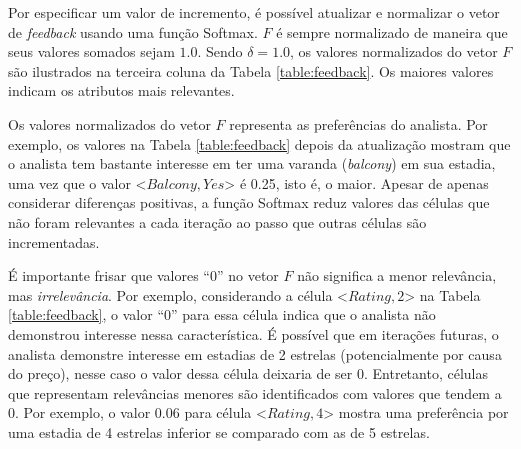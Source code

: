 Por especificar um valor de incremento, é possível atualizar e normalizar o vetor de {\em feedback} usando uma função Softmax. $F$ é sempre normalizado de maneira que seus valores somados sejam $1.0$. Sendo $\delta = 1.0$, os valores normalizados do vetor $F$ são ilustrados na terceira coluna da Tabela \ref{table:feedback}. Os maiores valores indicam os atributos mais relevantes.

Os valores normalizados do vetor $F$ representa as preferências do analista. Por exemplo, os valores na Tabela \ref{table:feedback} depois da atualização mostram que o analista tem bastante interesse em ter uma varanda ({\em balcony}) em sua estadia, uma vez que o valor \textless{}$Balcony, Yes$\textgreater{} é 0.25, isto é, o maior. Apesar de apenas considerar diferenças positivas, a função Softmax reduz valores das células que não foram relevantes a cada iteração ao passo que outras células são incrementadas.

É importante frisar que valores ``0'' no vetor $F$ não significa a menor relevância, mas {\em irrelevância}. Por exemplo, considerando a célula \textless{}$Rating, 2$\textgreater{} na Tabela \ref{table:feedback}, o valor ``0'' para essa célula indica que o analista não demonstrou interesse nessa característica. É possível que em iterações futuras, o analista demonstre interesse em estadias de 2 estrelas (potencialmente por causa do preço), nesse caso o valor dessa célula deixaria de ser 0. Entretanto, células que representam relevâncias menores são identificados com valores que tendem a 0. Por exemplo, o valor 0.06 para célula \textless{}$Rating, 4$\textgreater{} mostra uma preferência por uma estadia de 4 estrelas inferior se comparado com as de 5 estrelas.

